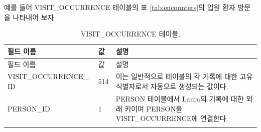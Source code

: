 \documentclass[10.5pt]{book}
\theoremstyle{definition}
\theoremstyle{definition}
\theoremstyle{definition}
\theoremstyle{remark}
\begin{document}
예를 들어 VISIT\_OCCURRENCE 테이블의 표 \ref{tab:encounters}의 입원 환자
방문을 나타내어 보자.

\begin{longtable}[]{@{}lll@{}}
\caption{\label{tab:visitOccurrence} VISIT\_OCCURRENCE
테이블.}\tabularnewline
\toprule
\begin{minipage}[b]{0.28\columnwidth}\raggedright\strut
필드 이름\strut
\end{minipage} & \begin{minipage}[b]{0.16\columnwidth}\raggedright\strut
값\strut
\end{minipage} & \begin{minipage}[b]{0.48\columnwidth}\raggedright\strut
설명\strut
\end{minipage}\tabularnewline
\midrule
\endfirsthead
\toprule
\begin{minipage}[b]{0.28\columnwidth}\raggedright\strut
필드 이름\strut
\end{minipage} & \begin{minipage}[b]{0.16\columnwidth}\raggedright\strut
값\strut
\end{minipage} & \begin{minipage}[b]{0.48\columnwidth}\raggedright\strut
설명\strut
\end{minipage}\tabularnewline
\midrule
\endhead
\begin{minipage}[t]{0.28\columnwidth}\raggedright\strut
VISIT\_OCCURRENCE\_ ID\strut
\end{minipage} & \begin{minipage}[t]{0.16\columnwidth}\raggedright\strut
514\strut
\end{minipage} & \begin{minipage}[t]{0.48\columnwidth}\raggedright\strut
이는 일반적으로 테이블의 각 기록에 대한 고유 식별자로서 자동으로
생성되는 값이다.\strut
\end{minipage}\tabularnewline
\begin{minipage}[t]{0.28\columnwidth}\raggedright\strut
PERSON\_ID\strut
\end{minipage} & \begin{minipage}[t]{0.16\columnwidth}\raggedright\strut
1\strut
\end{minipage} & \begin{minipage}[t]{0.48\columnwidth}\raggedright\strut
PERSON 테이블에서 Laura의 기록에 대한 외래 키이며 PERSON을
VISIT\_OCCURRENCE에 연결한다.\strut
\end{minipage}\tabularnewline
\begin{minipage}[t]{0.28\columnwidth}\raggedright\strut

\end{minipage}
\end{longtable}
\end{document}
